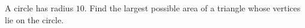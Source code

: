 A circle has radius $10$. Find the largest possible area of a triangle whose vertices lie on the circle.
